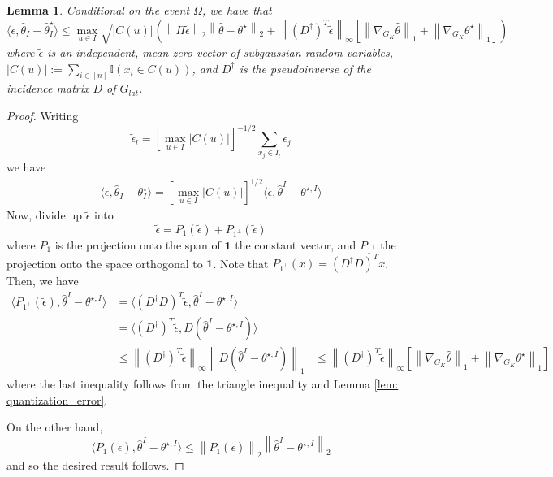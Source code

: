 \documentclass{article}
\newcommand{\norm}[1]{\left\lVert#1\right\rVert}
\newcommand{\abs}[1]{\left \lvert #1 \right \rvert}
\newcommand{\dotp}[2]{\langle #1, #2 \rangle}
\newcommand{\1}{\mathbb{I}}
\theoremstyle{alden}
\theoremstyle{aldenthm}
\newtheorem{lemma}{Lemma}
\theoremstyle{definition}
\theoremstyle{remark}
\begin{document}
\begin{lemma}
	Conditional on the event $\Omega$, we have that
	\begin{equation*}
	\dotp{\epsilon}{\widehat{\theta}_I - \widehat{\theta}_I^{\star}} \leq \max_{u \in I} \sqrt{\abs{C(u)}} \left( \norm{\Pi \widetilde{\epsilon}}_2 \norm{\widehat{\theta} - \theta^{\star}}_2  + \norm{(D^{\dagger})^T \widetilde{\epsilon}}_{\infty} \left[ \norm{\nabla_{G_K} \widehat{\theta} }_1 + \norm{\nabla_{G_K} \theta^{\star} }_1  \right]\right)
	\end{equation*}
	where $\widetilde{\epsilon}$ is an independent, mean-zero vector of subgaussian random variables, $\abs{C(u)} := \sum_{i \in [n]} \1(x_i \in C(u))$, and $D^{\dagger}$ is the pseudoinverse of the incidence matrix $D$ of $G_{lat}$.
\end{lemma}
\begin{proof}
	Writing
	\begin{equation*}
	\widetilde{\epsilon}_l = \left[\max_{u \in I} \abs{C(u)} \right]^{-1/2} \sum_{x_j \in I_l} \epsilon_j
	\end{equation*}
	we have
	\begin{align*}
	\dotp{\epsilon}{\widehat{\theta}_I - \theta_I^{\star}} = \left[\max_{u \in I} \abs{C(u)}\right]^{1/2} \dotp{\widetilde{\epsilon}}{\widehat{\theta}^{I} - \theta^{\star,I}}
	\end{align*}
	Now, divide up $\widetilde{\epsilon}$ into 
	\begin{equation*}
	\widetilde{\epsilon} = P_{1}(\widetilde{\epsilon}) + P_{1^{\perp}}(\widetilde{\epsilon})
	\end{equation*}
	where $P_1$ is the projection onto the span of $\mathbf{1}$ the constant vector, and $P_{1^{\perp}}$ the projection onto the space orthogonal to $\mathbf{1}$. Note that $P_{1^{\perp}}(x) = (D^{\dagger} D)^T x$. Then, we have
	\begin{align*}
	\dotp{P_{1^{\perp}}(\widetilde{\epsilon})}{\widehat{\theta}^{I} - \theta^{\star,I}} & = \dotp{(D^{\dagger} D)^T \widetilde{\epsilon}}{\widehat{\theta}^{I} - \theta^{\star,I}} \\
	& = \dotp{(D^{\dagger})^T \widetilde{\epsilon}}{D(\widehat{\theta}^{I} - \theta^{\star,I})} \\
	& \leq \norm{(D^{\dagger})^T \widetilde{\epsilon}}_{\infty} \norm{ D(\widehat{\theta}^{I} - \theta^{\star,I})  }_1
	& \leq \norm{(D^{\dagger})^T \widetilde{\epsilon}}_{\infty} \left[ \norm{\nabla_{G_K} \widehat{\theta} }_1 + \norm{\nabla_{G_K} \theta^{\star} }_1 \right]
	\end{align*}
	where the last inequality follows from the triangle inequality and Lemma \ref{lem: quantization_error}.
	
	On the other hand,
	\begin{equation*}
	\dotp{P_{1}(\widetilde{\epsilon})}{\widehat{\theta}^{I} - \theta^{\star,I}} \leq \norm{P_{1}(\widetilde{\epsilon})}_2 \norm{\widehat{\theta}^{I} - \theta^{\star,I}}_2
	\end{equation*}
	and so the desired result follows.
\end{proof}
\end{document}
